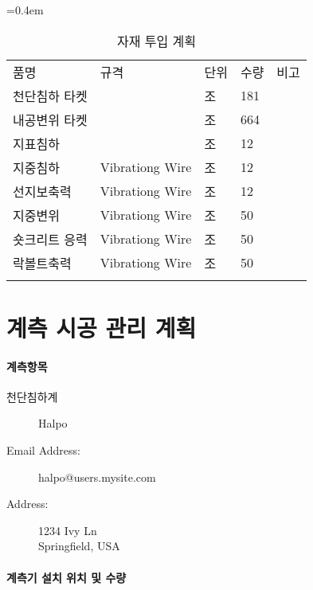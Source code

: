 			\begin{table} [h]
	
			\caption{자재 투입 계획} 
			\label{tab:title} 
	
			\begin{center}
			\tabulinesep=0.4em
			\begin{tabu} to 1.0\linewidth { X[1.4,r] X[1.4,l] X[0.6,c] X[c] X[0.6,c] }
			\tabucline [1pt,] {-}
			품명			&규격				&단위		&수량		&비고\\
			\tabucline [0.1pt,] {-}
			천단침하 타켓	&					&조			&181		&\\
			내공변위 타켓	&					&조			&664		&\\
			지표침하		&					&조			&12			&\\
			지중침하		&Vibrationg Wire	&조			&12			&\\
			선지보축력		&Vibrationg Wire	&조			&12			&\\
			지중변위		&Vibrationg Wire	&조			&50			&\\
			숏크리트 응력	&Vibrationg Wire	&조			&50			&\\
			락볼트축력		&Vibrationg Wire	&조			&50			&\\
			\tabucline [0.1pt,] {-}
			\end{tabu} 
			\end{center}
			\end{table}
		




	\section{계측 시공 관리 계획}

		\paragraph{계측항목}


		\begin{description}
		\item[천단침하계]  Halpo
		\item[Email Address:] halpo@users.mysite.com
		\item[Address:]  1234 Ivy Ln \\ Springfield, USA
		\end{description}
		
		\paragraph{계측기 설치 위치 및 수량}
		
